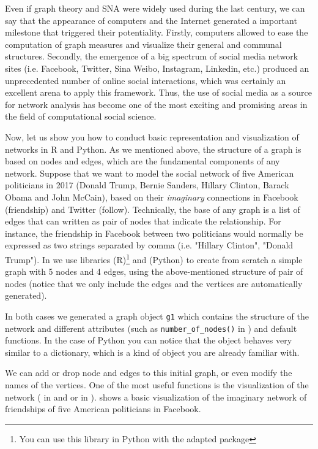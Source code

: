 Even if graph theory and SNA were widely used during the last century, we can say that the appearance of computers and the Internet generated a important milestone that triggered their potentiality. Firstly, computers allowed to ease the computation of graph measures and visualize their general and communal structures. Secondly, the emergence of a big spectrum of social media network sites (i.e. Facebook, Twitter, Sina Weibo, Instagram, Linkedin, etc.) produced an unprecedented number of online social interactions, which was certainly an excellent arena to apply this framework. Thus, the use of social media as a source for network analysis has become one of the most exciting and promising areas in the field of computational social science.

Now, let us show you how to conduct basic representation and visualization of networks in R and Python. As we mentioned above, the structure of a graph is based on nodes and edges, which are the fundamental components of any network. Suppose that we want to model the social network of five American politicians in 2017 (Donald Trump, Bernie Sanders, Hillary Clinton, Barack Obama and John McCain), based on their \textit{imaginary} connections in Facebook (friendship) and Twitter (follow). Technically, the base of any graph is a list of edges that can written as pair of nodes that indicate 	the relationship.  For instance, the friendship in Facebook between two politicians would normally be expressed as two strings separated by comma (i.e. "Hillary Clinton", "Donald Trump"). In  we use libraries  (R)\footnote{You can use this library in Python with the adapted package }  and  (Python) to create from scratch a simple graph with 5 nodes and 4 edges, using the above-mentioned structure of pair of nodes (notice that we only include the edges and the vertices are automatically generated).


In both cases we generated a graph object \texttt{g1} which contains the structure of the network and different attributes (such as \verb|number_of_nodes()| in 	) and default functions. In the case of Python you can notice that the  object behaves very similar to a dictionary, which is a kind of object you are already familiar with.

We can add or drop node and edges to this initial graph, or even modify the names of the vertices. One of the most useful functions is the visualization of the network ( in  and  or  in ).  shows a basic visualization of the imaginary network of friendships of five American politicians in Facebook.

